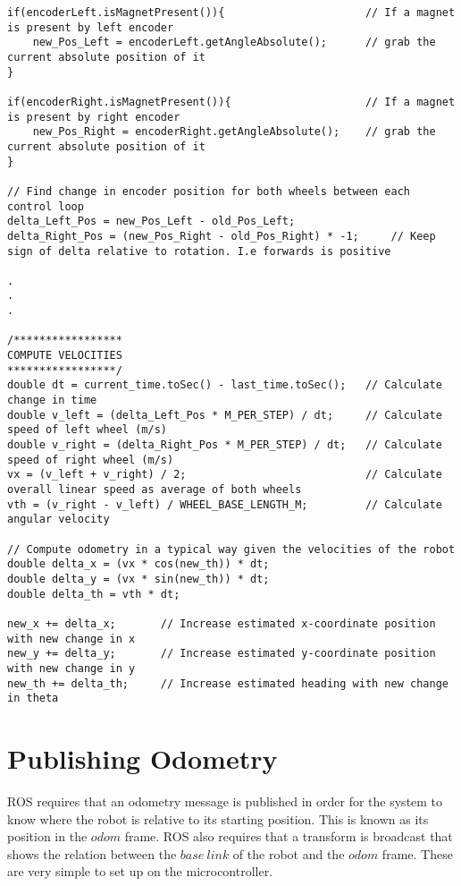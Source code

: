 \begin{verbatim}
if(encoderLeft.isMagnetPresent()){                      // If a magnet is present by left encoder
    new_Pos_Left = encoderLeft.getAngleAbsolute();      // grab the current absolute position of it
}   

if(encoderRight.isMagnetPresent()){                     // If a magnet is present by right encoder
    new_Pos_Right = encoderRight.getAngleAbsolute();    // grab the current absolute position of it
}

// Find change in encoder position for both wheels between each control loop
delta_Left_Pos = new_Pos_Left - old_Pos_Left;
delta_Right_Pos = (new_Pos_Right - old_Pos_Right) * -1;     // Keep sign of delta relative to rotation. I.e forwards is positive

.
.
.

/*****************
COMPUTE VELOCITIES
*****************/
double dt = current_time.toSec() - last_time.toSec();   // Calculate change in time
double v_left = (delta_Left_Pos * M_PER_STEP) / dt;     // Calculate speed of left wheel (m/s)
double v_right = (delta_Right_Pos * M_PER_STEP) / dt;   // Calculate speed of right wheel (m/s)
vx = (v_left + v_right) / 2;                            // Calculate overall linear speed as average of both wheels
vth = (v_right - v_left) / WHEEL_BASE_LENGTH_M;         // Calculate angular velocity

// Compute odometry in a typical way given the velocities of the robot
double delta_x = (vx * cos(new_th)) * dt;
double delta_y = (vx * sin(new_th)) * dt;
double delta_th = vth * dt;

new_x += delta_x;       // Increase estimated x-coordinate position with new change in x
new_y += delta_y;       // Increase estimated y-coordinate position with new change in y
new_th += delta_th;     // Increase estimated heading with new change in theta
\end{verbatim}


\section{Publishing Odometry}

ROS requires that an odometry message is published in order for the system to know where the robot is relative to its starting position. This is known as its position in the $odom$ frame. ROS also requires that a transform is broadcast that shows the relation between the $base \ link$ of the robot and the $odom$ frame. These are very simple to set up on the microcontroller.

